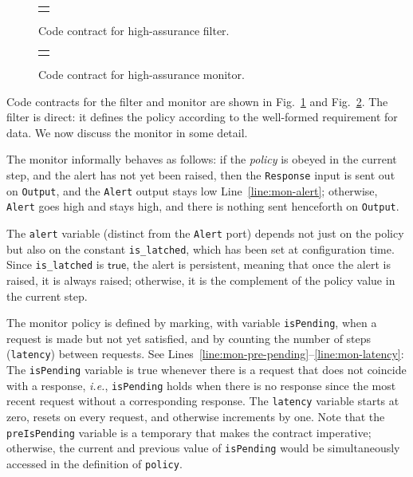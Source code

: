 \documentclass[global,twocolumn]{svjour}
\newcommand{\konst}[1]{\ensuremath{\mathsf{#1}}}
\newcommand{\figref}[1]{Fig.~\ref{#1}}
\newcommand{\lineref}[1]{Line~\ref{#1}}
\newcommand{\linesref}[2]{Lines~\ref{#1}--\ref{#2}}
\newcommand{\ie}{\textit{i.e.}}
\begin{document}
\begin{figure}
  \begin{center}
    \begin{tabular}{c}
      \resizebox{\columnwidth}{!}{\usebox{\flt}} \\
    \end{tabular}
  \end{center}
  \caption{Code contract for high-assurance filter.}
  \label{fig:filter}
\end{figure}

\begin{figure}
  \begin{center}
    \begin{tabular}{c}
      \resizebox{\columnwidth}{!}{\usebox{\mntr}} \\
    \end{tabular}
  \end{center}
  \caption{Code contract for high-assurance monitor.}
  \label{fig:monitor}
\end{figure}

Code contracts for the filter and monitor are shown in \figref{fig:filter} and \figref{fig:monitor}.
%
The filter is direct: it defines the policy according to the well-formed requirement for data.
%
We now discuss the monitor in some detail.

The monitor informally behaves as follows: if the \emph{policy} is obeyed in the current step, and the alert has not yet been raised, then the \texttt{Response} input is sent out on \texttt{Output}, and the \texttt{Alert} output stays low \lineref{line:mon-alert};
%
otherwise, \texttt{Alert} goes high and stays high, and there is nothing sent henceforth on \texttt{Output}.

The \texttt{alert} variable (distinct from the \texttt{Alert} port) depends not just on the policy but also on the constant \texttt{is\_latched}, which has been set at configuration time.
%
Since \texttt{is\_latched} is \konst{true}, the alert is persistent, meaning that once the alert is raised, it is always raised;
%
otherwise, it is the complement of the policy value in the current step.

The monitor policy is defined by marking, with variable \texttt{isPending}, when a request is made but not yet satisfied, and by counting the number of steps (\texttt{latency}) between requests.
%
See \linesref{line:mon-pre-pending}{line:mon-latency}:
%
The \texttt{isPending} variable is true whenever there is a request that does not coincide with a response, \ie, \texttt{isPending} holds when there is no response since the most recent request without a corresponding response.
%
The \texttt{latency} variable starts at zero, resets on every request, and otherwise increments by one.  Note that the \texttt{preIsPending} variable is a temporary that makes the contract imperative;
%
otherwise, the current and previous value of \texttt{isPending} would be simultaneously accessed in the definition of \texttt{policy}.
\end{document}
